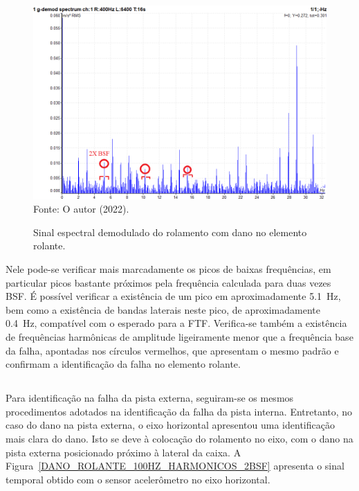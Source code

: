 \documentclass[
	12pt,				
	oneside,			
	a4paper,			
	english,			
	brazil,			
	]{abntex2ppgsi}
\begin{document}
\begin{figure}[H]
\centering
\caption {Sinal espectral demodulado do rolamento com dano no elemento rolante.}
\includegraphics[width=\textwidth,keepaspectratio]{2bsf_anotado} \\
Fonte: O autor (2022).
\label{2bsf_anotado}
\end{figure}

Nele pode-se verificar mais marcadamente os picos de baixas frequências, em particular picos bastante próximos pela frequência calculada para duas vezes BSF. É possível verificar a existência de um pico em aproximadamente \SI{5,1}{\hertz}, bem como a existência de bandas laterais neste pico, de aproximadamente \SI{0,4}{\hertz}, compatível com o esperado para a FTF. Verifica-se também a existência de frequências harmônicas de amplitude ligeiramente menor que a frequência base da falha, apontadas nos círculos vermelhos, que apresentam o mesmo padrão e confirmam a identificação da falha no elemento rolante.

\subsection{}

Para identificação na falha da pista externa, seguiram-se os mesmos procedimentos adotados na identificação da falha da pista interna. Entretanto, no caso do dano na pista externa, o eixo horizontal apresentou uma identificação mais clara do dano. Isto se deve à colocação do rolamento no eixo, com o dano na pista externa posicionado próximo à lateral da caixa. A Figura~\ref{DANO_ROLANTE_100HZ_HARMONICOS_2BSF} apresenta o sinal temporal obtido com o sensor acelerômetro no eixo horizontal.
\end{document}
